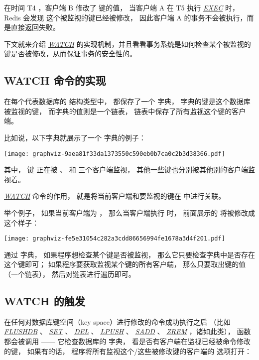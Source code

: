 \documentclass[a4paper,11pt,english]{sphinxmanual}
\begin{document}
在时间 T4 ，客户端 B 修改了  键的值，
当客户端 A 在 T5 执行 \href{http://redis.readthedocs.org/en/latest/transaction/exec.html\#exec}{\emph{EXEC}} 时，Redis 会发现  这个被监视的键已经被修改，
因此客户端 A 的事务不会被执行，而是直接返回失败。

下文就来介绍 \href{http://redis.readthedocs.org/en/latest/transaction/watch.html\#watch}{\emph{WATCH}} 的实现机制，并且看看事务系统是如何检查某个被监视的键是否被修改，从而保证事务的安全性的。


\subsection{WATCH 命令的实现}
\label{feature/transaction:id7}
在每个代表数据库的  结构类型中，
都保存了一个  字典，
字典的键是这个数据库被监视的键，
而字典的值则是一个链表，
链表中保存了所有监视这个键的客户端。

比如说，以下字典就展示了一个  字典的例子：

\texttt{[image: graphviz-9aea81f33da1373550c590eb0b7ca0c2b3d38366.pdf]}

其中， 键  正在被  、  和  三个客户端监视，
其他一些键也分别被其他别的客户端监视着。

\href{http://redis.readthedocs.org/en/latest/transaction/watch.html\#watch}{\emph{WATCH}} 命令的作用，
就是将当前客户端和要监视的键在  中进行关联。

举个例子，
如果当前客户端为  ，
那么当客户端执行  时，
前面展示的  将被修改成这个样子：

\texttt{[image: graphviz-fe5e31054c282a3cdd86656994fe1678a3d4f201.pdf]}

通过  字典，
如果程序想检查某个键是否被监视，
那么它只要检查字典中是否存在这个键即可；
如果程序要获取监视某个键的所有客户端，
那么只要取出键的值（一个链表），
然后对链表进行遍历即可。


\subsection{WATCH 的触发}
\label{feature/transaction:id8}
在任何对数据库键空间（key space）进行修改的命令成功执行之后
（比如 \href{http://redis.readthedocs.org/en/latest/server/flushdb.html\#flushdb}{\emph{FLUSHDB}} 、 \href{http://redis.readthedocs.org/en/latest/string/set.html\#set}{\emph{SET}} 、 \href{http://redis.readthedocs.org/en/latest/key/del.html\#del}{\emph{DEL}} 、 \href{http://redis.readthedocs.org/en/latest/list/lpush.html\#lpush}{\emph{LPUSH}} 、 \href{http://redis.readthedocs.org/en/latest/set/sadd.html\#sadd}{\emph{SADD}} 、 \href{http://redis.readthedocs.org/en/latest/sorted\_set/zrem.html\#zrem}{\emph{ZREM}} ，诸如此类），
 函数都会被调用 ——
它检查数据库的  字典，
看是否有客户端在监视已经被命令修改的键，
如果有的话，
程序将所有监视这个/这些被修改键的客户端的  选项打开：
\end{document}
